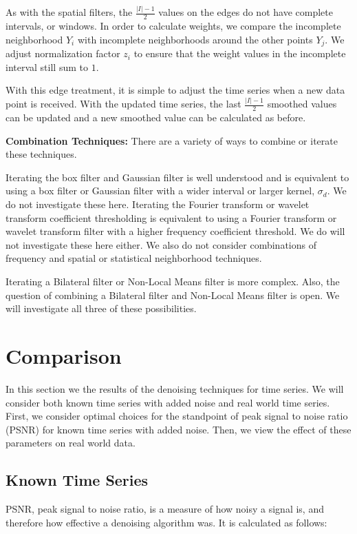 \documentclass[11pt]{article}
\newcommand{\vs}{\vspace{0.1in}}
\theoremstyle{definition}
\begin{document}
As with the spatial filters, the $\frac{\lvert I \rvert - 1}{2}$ values on the edges do not have complete intervals, or windows. In order to calculate weights, we compare the incomplete neighborhood $Y_i$ with incomplete neighborhoods around the other points $Y_j$. We adjust normalization factor $z_i$ to ensure that the weight values in the incomplete interval still sum to $1$.

With this edge treatment, it is simple to adjust the time series when a new data point is received. With the updated time series, the last $\frac{\lvert I \rvert - 1}{2}$ smoothed values can be updated and a new smoothed value can be calculated as before.

\vs
\noindent
\textbf{Combination Techniques:} There are a variety of ways to combine or iterate these techniques.

Iterating the box filter and Gaussian filter is well understood and is equivalent to using a box filter or Gaussian filter with a wider interval or larger kernel, $\sigma_d$. We do not investigate these here. Iterating the Fourier transform or wavelet transform coefficient thresholding is equivalent to using a Fourier transform or wavelet transform filter with a higher frequency coefficient threshold. We do will not investigate these here either. We also do not consider combinations of frequency and spatial or statistical neighborhood techniques.

Iterating a Bilateral filter or Non-Local Means filter is more complex. Also, the question of combining a Bilateral filter and Non-Local Means filter is open. We will investigate all three of these possibilities.


\section{Comparison}

In this section we the results of the denoising techniques for time series. We will consider both known time series with added noise and real world time series. First, we consider optimal choices for the standpoint of peak signal to noise ratio (PSNR) for known time series with added noise. Then, we view the effect of these parameters on real world data.


\subsection{Known Time Series} PSNR, peak signal to noise ratio, is a measure of how noisy a signal is, and therefore how effective a denoising algorithm was. It is calculated as follows:
\end{document}
